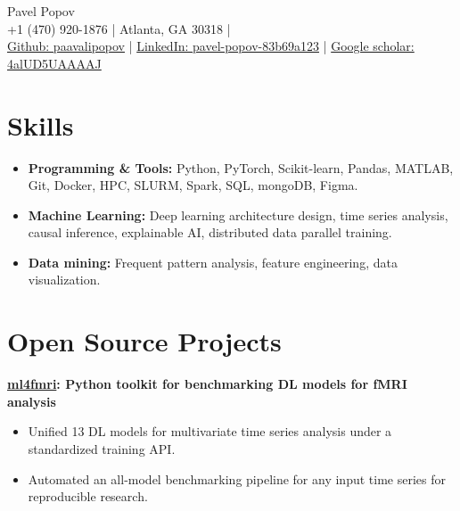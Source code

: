 \documentclass[11pt,a4paper]{article}
\begin{document}
\begin{center}
  {\Huge Pavel Popov}\\[0.5em]
  {\footnotesize +1 (470) 920-1876 \quad | \quad Atlanta, GA 30318} \quad | \\
  {\small \href{https://github.com/paavalipopov}{Github: paavalipopov} \quad | \quad
  \href{https://www.linkedin.com/in/pavel-popov-83b69a123/}{LinkedIn: pavel-popov-83b69a123} \quad | \quad
  \href{https://scholar.google.com/citations?user=4alUD5UAAAAJ}{Google scholar: 4alUD5UAAAAJ}}
\end{center}

\section*{Skills}
\begin{itemize}
[leftmargin=*,noitemsep]
\item \textbf{Programming \& Tools:} Python, PyTorch, Scikit-learn, Pandas, MATLAB, Git, Docker, HPC, SLURM, Spark, SQL, mongoDB, Figma.
\item \textbf{Machine Learning:} Deep learning architecture design, time series analysis, causal inference, explainable AI, distributed data parallel training.
\item \textbf{Data mining:} Frequent pattern analysis, feature engineering, data visualization.
\end{itemize}

\section*{Open Source Projects}
\noindent\textbf{\href{https://pypi.org/project/ml4fmri/}{ml4fmri}: Python toolkit for benchmarking DL models for fMRI analysis}\\
[-2em]
\begin{itemize}[leftmargin=*,noitemsep]
    \item Unified 13 DL models for multivariate time series analysis under a standardized training API.
    \item Automated an all-model benchmarking pipeline for any input time series for reproducible research.
\end{itemize}
\end{document}
